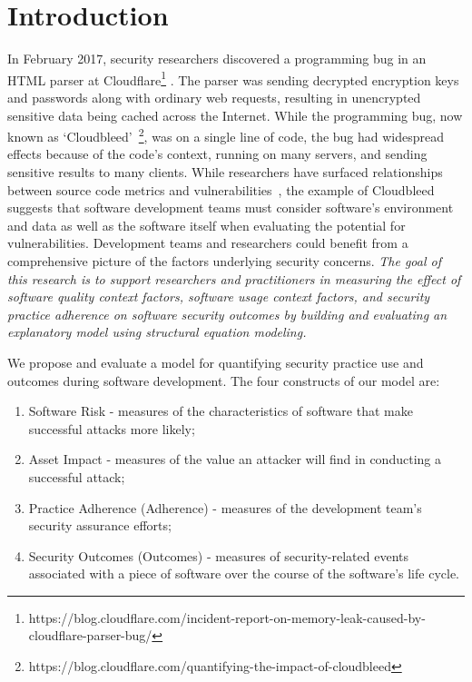 \section{Introduction}
\label{sec:intro}

In February 2017, security researchers discovered a programming bug in an HTML parser at Cloudflare\footnote{https://blog.cloudflare.com/incident-report-on-memory-leak-caused-by-cloudflare-parser-bug/} . The parser was sending decrypted encryption keys and passwords along with ordinary web requests, resulting in unencrypted sensitive data being cached across the Internet. While the programming bug, now known as `Cloudbleed'~\footnote{https://blog.cloudflare.com/quantifying-the-impact-of-cloudbleed}, was on a single line of code, the bug had widespread effects because of the code's context, running on many servers, and sending sensitive results to many clients. While researchers have surfaced relationships between source code metrics and vulnerabilities~\cite{zimmerman2010searching,alhazmi2007measuring,meneely2013when,shin2011evaluating}, the example of Cloudbleed suggests that software development teams must consider software's environment and data as well as the software itself when evaluating the potential for vulnerabilities. Development teams and researchers could benefit from a comprehensive picture of the factors underlying security concerns.
\textit{The goal of this research is to support researchers and practitioners in measuring the effect of software quality context factors, software usage context factors, and security practice adherence on software security outcomes by building and evaluating an explanatory model using structural equation modeling.}

We propose and evaluate a model for quantifying security practice use and outcomes during software development. The four constructs of our model are:
\begin{enumerate}
	\item Software Risk - measures of the characteristics of software that make successful attacks more likely;	
	\item Asset Impact - measures of the value an attacker will find in conducting a successful attack;
	\item Practice Adherence (Adherence) - measures of the development team's security assurance efforts; 
	\item Security Outcomes (Outcomes) - measures of security-related events associated with a piece of software over the course of the software's life cycle.
\end{enumerate}

